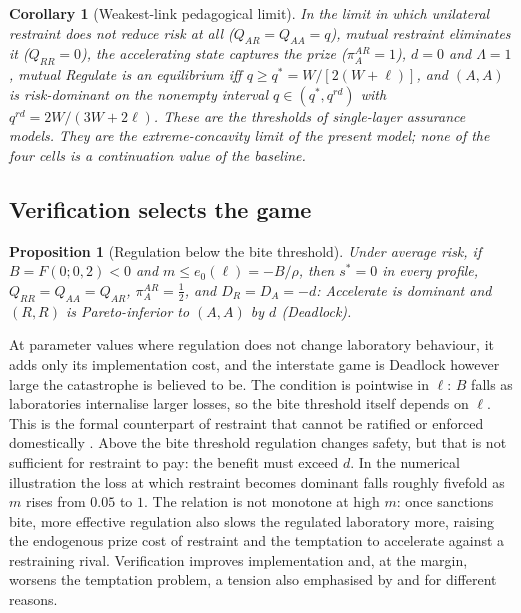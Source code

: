 \documentclass[11pt]{article}
\theoremstyle{plain}
\newtheorem{proposition}{Proposition}
\newtheorem{corollary}{Corollary}
\theoremstyle{definition}
\theoremstyle{remark}
\newcommand{\Lam}{\Lambda}
\begin{document}
\begin{corollary}[Weakest-link pedagogical limit]
In the limit in which unilateral restraint does not reduce risk at all ($Q_{AR}=Q_{AA}=q$), mutual restraint eliminates it ($Q_{RR}=0$), the accelerating state captures the prize ($\pi_A^{AR}=1$), $d=0$ and $\Lam=1$, mutual Regulate is an equilibrium iff $q\ge q^*=W/[2(W+\ell)]$, and $(A,A)$ is risk-dominant on the nonempty interval $q\in(q^*,q^{rd})$ with $q^{rd}=2W/(3W+2\ell)$. These are the thresholds of single-layer assurance models. They are the extreme-concavity limit of the present model; none of the four cells is a continuation value of the baseline.
\end{corollary}

\subsection{Verification selects the game}

\begin{proposition}[Regulation below the bite threshold]
Under average risk, if $B=F(0;0,2)<0$ and $m\le e_0(\ell)=-B/\rho$, then $s^*=0$ in every profile, $Q_{RR}=Q_{AA}=Q_{AR}$, $\pi^{AR}_A=\tfrac12$, and $D_R=D_A=-d$: Accelerate is dominant and $(R,R)$ is Pareto-inferior to $(A,A)$ by $d$ (Deadlock).
\end{proposition}

At parameter values where regulation does not change laboratory behaviour, it adds only its implementation cost, and the interstate game is Deadlock however large the catastrophe is believed to be. The condition is pointwise in $\ell$: $B$ falls as laboratories internalise larger losses, so the bite threshold itself depends on $\ell$. This is the formal counterpart of restraint that cannot be ratified or enforced domestically \citep{putnam1988}. Above the bite threshold regulation changes safety, but that is not sufficient for restraint to pay: the benefit must exceed $d$. In the numerical illustration the loss at which restraint becomes dominant falls roughly fivefold as $m$ rises from $0.05$ to $1$. The relation is not monotone at high $m$: once sanctions bite, more effective regulation also slows the regulated laboratory more, raising the endogenous prize cost of restraint and the temptation to accelerate against a restraining rival. Verification improves implementation and, at the margin, worsens the temptation problem, a tension also emphasised by \citet{coe2020} and \citet{emery2024} for different reasons.
\end{document}
